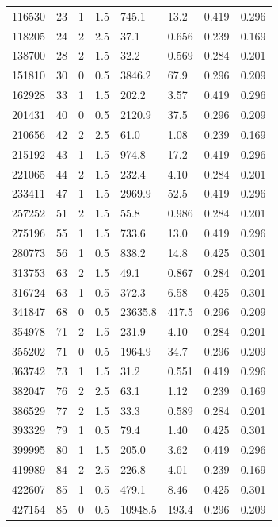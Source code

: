 \documentclass[preview]{standalone}
\begin{document}
{{\begin{tabular}{L{1.2cm}C{1.2cm} C{0.3cm}C{0.5cm} C{1.4cm}C{1.4cm} C{1.4cm}C{1.4cm}}
  116530  &    23  & 1     & 1.5 &  745.1  & 13.2  & 0.419 &  0.296   \\ 
  118205  &    24  & 2     & 2.5 &  37.1  & 0.656  & 0.239 &  0.169   \\ 
  138700  &    28  & 2     & 1.5 &  32.2  & 0.569  & 0.284 &  0.201   \\ 
  151810  &    30  & 0     & 0.5 &  3846.2  & 67.9  & 0.296 &  0.209   \\ 
  162928  &    33  & 1     & 1.5 &  202.2  & 3.57  & 0.419 &  0.296   \\ 
  201431  &    40  & 0     & 0.5 &  2120.9  & 37.5  & 0.296 &  0.209   \\ 
  210656  &    42  & 2     & 2.5 &  61.0  & 1.08  & 0.239 &  0.169   \\ 
  215192  &    43  & 1     & 1.5 &  974.8  & 17.2  & 0.419 &  0.296   \\ 
  221065  &    44  & 2     & 1.5 &  232.4  & 4.10  & 0.284 &  0.201   \\ 
  233411  &    47  & 1     & 1.5 &  2969.9  & 52.5  & 0.419 &  0.296   \\ 
  257252  &    51  & 2     & 1.5 &  55.8  & 0.986  & 0.284 &  0.201   \\ 
  275196  &    55  & 1     & 1.5 &  733.6  & 13.0  & 0.419 &  0.296   \\ 
  280773  &    56  & 1     & 0.5 &  838.2  & 14.8  & 0.425 &  0.301   \\ 
  313753  &    63  & 2     & 1.5 &  49.1  & 0.867  & 0.284 &  0.201   \\ 
  316724  &    63  & 1     & 0.5 &  372.3  & 6.58  & 0.425 &  0.301   \\ 
  341847  &    68  & 0     & 0.5 &  23635.8  & 417.5  & 0.296 &  0.209   \\ 
  354978  &    71  & 2     & 1.5 &  231.9  & 4.10  & 0.284 &  0.201   \\ 
  355202  &    71  & 0     & 0.5 &  1964.9  & 34.7  & 0.296 &  0.209   \\ 
  363742  &    73  & 1     & 1.5 &  31.2  & 0.551  & 0.419 &  0.296   \\ 
  382047  &    76  & 2     & 2.5 &  63.1  & 1.12  & 0.239 &  0.169   \\ 
  386529  &    77  & 2     & 1.5 &  33.3  & 0.589  & 0.284 &  0.201   \\ 
  393329  &    79  & 1     & 0.5 &  79.4  & 1.40  & 0.425 &  0.301   \\ 
  399995  &    80  & 1     & 1.5 &  205.0  & 3.62  & 0.419 &  0.296   \\ 
  419989  &    84  & 2     & 2.5 &  226.8  & 4.01  & 0.239 &  0.169   \\ 
  422607  &    85  & 1     & 0.5 &  479.1  & 8.46  & 0.425 &  0.301   \\ 
  427154  &    85  & 0     & 0.5 &  10948.5  & 193.4  & 0.296 &  0.209   \\ 
\hline 
\end{tabular} 

}}
\end{document}
